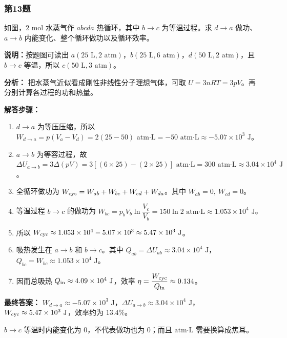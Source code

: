 \documentclass[12pt,a4paper]{ctexart}
\begin{document}
\subsubsection*{第13题}
\begin{tcolorbox}[colback=gray!2!white,colframe=black!60,title={题目}]
如图，\(2\text{ mol}\) 水蒸气作 \(abcda\) 热循环，其中 \(b\to c\) 为等温过程。求 \(d\to a\) 做功、\(a\to b\) 内能变化、整个循环做功以及循环效率。\par
\vspace{0.4em}
\textbf{说明：}按题图可读出 \(a(25\text{ L},2\text{ atm})\)，\(b(25\text{ L},6\text{ atm})\)，\(d(50\text{ L},2\text{ atm})\)，且 \(b\to c\) 等温，所以 \(c(50\text{ L},3\text{ atm})\)。\par
\end{tcolorbox}
\begin{tcolorbox}[colback=blue!2!white,colframe=blue!55!black,title={完整答案}]
\textbf{分析：}
把水蒸气近似看成刚性非线性分子理想气体，可取 \(U=3nRT=3pV\)。再分别计算各过程的功和热量。\par
\textbf{解答步骤：}
\begin{enumerate}
\item \(d\to a\) 为等压压缩，所以 \(W_{d\to a}=p(V_a-V_d)=2(25-50)\text{ atm·L}=-50\text{ atm·L}\approx -5.07\times 10^3\text{ J}\)。
\item \(a\to b\) 为等容过程，故 \(\Delta U_{a\to b}=3\Delta(pV)=3[(6\times 25)-(2\times 25)]\text{ atm·L}=300\text{ atm·L}\approx 3.04\times 10^4\text{ J}\)。
\item 全循环做功为 \(W_{\rm cyc}=W_{ab}+W_{bc}+W_{cd}+W_{da}\)。其中 \(W_{ab}=0,\ W_{cd}=0\)。
\item 等温过程 \(b\to c\) 的做功为 \(W_{bc}=p_bV_b\ln \dfrac{V_c}{V_b}=150\ln 2\text{ atm·L}\approx 1.053\times 10^4\text{ J}\)。
\item 所以 \(W_{\rm cyc}\approx 1.053\times 10^4-5.07\times 10^3\approx 5.47\times 10^3\text{ J}\)。
\item 吸热发生在 \(a\to b\) 和 \(b\to c\)。其中 \(Q_{ab}=\Delta U_{ab}\approx 3.04\times 10^4\text{ J}\)，\(Q_{bc}=W_{bc}\approx 1.053\times 10^4\text{ J}\)。
\item 因而总吸热 \(Q_{\rm in}\approx 4.09\times 10^4\text{ J}\)，效率 \(\eta=\dfrac{W_{\rm cyc}}{Q_{\rm in}}\approx 0.134\)。
\end{enumerate}
\textbf{最终答案：}
\(W_{d\to a}\approx -5.07\times 10^3\text{ J}\)，\(\Delta U_{a\to b}\approx 3.04\times 10^4\text{ J}\)，\(W_{\rm cyc}\approx 5.47\times 10^3\text{ J}\)，效率约为 \(13.4\%\)。\par
\end{tcolorbox}
\begin{tcolorbox}[colback=red!2!white,colframe=red!55!black,title={易错点}]
\(b\to c\) 等温时内能变化为 0，不代表做功也为 0；而且 \(\text{atm·L}\) 需要换算成焦耳。\par
\end{tcolorbox}
\end{document}
